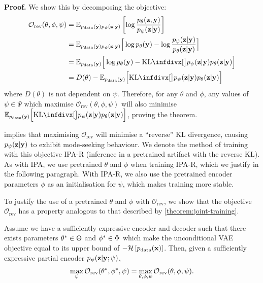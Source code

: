 \textbf{Proof.}
We show this by decomposing the objective:
\begin{align} \label{eq:reverse-obj-supp}
  \mathcal{O}_\text{rev}(\theta, \phi, \psi ) &= \EX_{\pdata (\rvy)p_\psi(\rvz|\rvy)} \left[ \log\frac{p_\theta(\rvz,\rvy)}{p_\psi(\rvz|\rvy)} \right] \\
                                                   &= \EX_{\pdata (\rvy)p_\psi(\rvz|\rvy)}\Big[ \log p_\theta(\rvy) - \log\frac{p_\psi(\rvz|\rvy)}{p_\theta(\rvz|\rvy)} \Big] \\
  &= \EX_{\pdata (\rvy)}\Big[ \log p_\theta(\rvy) - \kl[\big] { p_\psi(\rvz|\rvy) }{ p_\theta(\rvz|\rvy) } \Big] \\
                                                   &= D(\theta) - \EX_{\pdata (\rvy)}\Big[ \kl[\big] { p_\psi(\rvz|\rvy) }{ p_\theta(\rvz|\rvy) } \Big]
\end{align}
where $D(\theta)$ is not dependent on $\psi$. Therefore, for any $\theta$
and $\phi$, any values of $\psi\in\Psi$ which maximise
$\mathcal{O}_\text{rev}(\theta, \phi, \psi )$ will also minimise
$\EX_{\pdata (\rvy)}\Big[ \kl[\big] { p_\psi(\rvz|\rvy) }{
  p_\theta(\rvz|\rvy) } \Big]$, proving the theorem.


 implies that maximising $\mathcal{O}_{\text{rev}}$
will minimise a ``reverse'' KL divergence, causing $p_\psi({\mathbf{z}}|{\mathbf{y}})$ to
exhibit mode-seeking behaviour. We denote the method of training with this
objective IPA-R (inference in a pretrained artifact with the reverse KL).
As with IPA, we use pretrained $\theta$ and $\phi$ when training IPA-R, which we
justify in the following paragraph. With IPA-R, we also use the pretrained
encoder parameters $\phi$ as an initialisation for $\psi $, which makes
training more stable.

To justify the use of a pretrained $\theta$ and $\phi$ with
$\mathcal{O}_\text{rev}$, we show that the objective $\mathcal{O}_\text{rev}$
has a property analogous to that described by \cref{theorem:joint-training}.
\begin{theorem}
  \label{theorem:joint-training-rev}
  Assume we have a sufficiently expressive encoder and decoder such that there
  exists parameters ${\theta}^*\in\Theta$ and ${\phi}^*\in\Phi$
  which make the unconditional VAE objective equal to its
  upper bound of $-\mathcal{H}\left[ p_{\rm{data}}({\mathbf{x}}) \right]$. Then, given a
  sufficiently expressive partial encoder $p_\psi({\mathbf{z}}|{\mathbf{y}}; \psi)$,
  \begin{equation*}
    \max_{\psi } \mathcal{O}_\text{rev}({\theta}^*, {\phi}^*, \psi ) = \max_{\theta, \phi, \psi } \mathcal{O}_\text{rev}(\theta, \phi, \psi ).
  \end{equation*}
\end{theorem}

